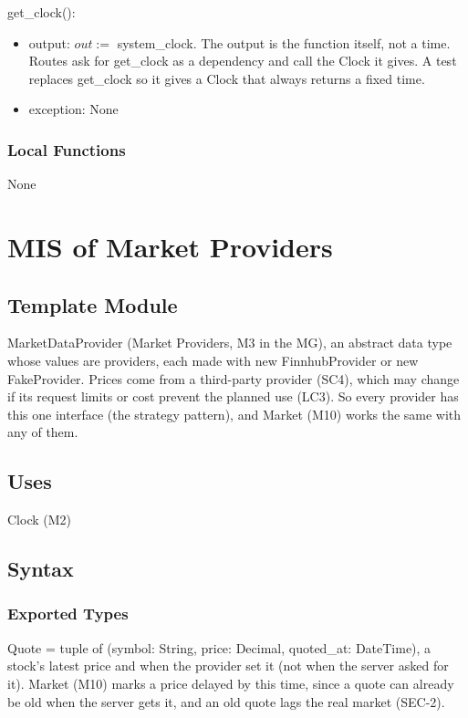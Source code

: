 \documentclass[12pt, titlepage]{article}
\begin{document}
\noindent get\_clock():
\begin{itemize}
\item output: $out := $ system\_clock. The output is the function itself, not
  a time. Routes ask for get\_clock as a dependency and call the Clock it
  gives. A test replaces get\_clock so it gives a Clock that always returns a
  fixed time.
\item exception: None
\end{itemize}

\subsubsection{Local Functions}

None

\newpage

\section{MIS of Market Providers} \label{MisProviders}

\subsection{Template Module}

MarketDataProvider (Market Providers, M3 in the MG), an abstract data type
whose values are providers, each made with new FinnhubProvider or new
FakeProvider. Prices come from a third-party provider (SC4), which may change
if its request limits or cost prevent the planned use (LC3). So every provider
has this one interface (the strategy pattern), and Market (M10) works the same
with any of them.

\subsection{Uses}

Clock (M2)

\subsection{Syntax}

\subsubsection{Exported Types}

\noindent Quote = tuple of (symbol: String, price: Decimal, quoted\_at:
DateTime), a stock's latest price and when the provider set it (not when the
server asked for it). Market (M10) marks a price delayed by this time,
since a quote can already be old when the server gets it, and an old quote
lags the real market (SEC-2).
\end{document}

